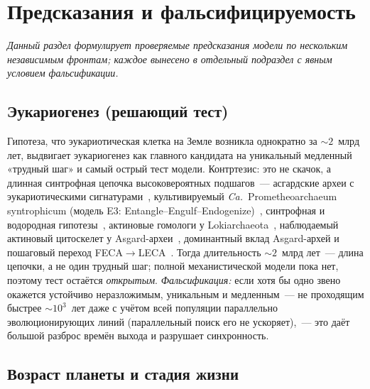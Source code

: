 \documentclass[12pt,a4paper]{article}
\begin{document}
\section{Предсказания и фальсифицируемость}
\label{sec:predictions}

\textit{Данный раздел формулирует проверяемые предсказания модели по нескольким независимым фронтам; каждое вынесено в отдельный подраздел с явным условием фальсификации.}

\subsection{Эукариогенез (решающий тест)}
\label{sec:eukaryo}

Гипотеза, что эукариотическая клетка на Земле возникла однократно за $\sim 2$~млрд лет, выдвигает эукариогенез как главного кандидата на уникальный медленный «трудный шаг» и самый острый тест модели. Контртезис: это не скачок, а длинная синтрофная цепочка высоковероятных подшагов~--- асгардские археи с эукариотическими сигнатурами~\cite{Spang2015,Zaremba2017}, культивируемый \emph{Ca.}~Prometheoarchaeum syntrophicum (модель E3: Entangle--Engulf--Endogenize)~\cite{Imachi2020}, синтрофная и водородная гипотезы~\cite{LopezGarcia2020,Martin1998}, актиновые гомологи у Lokiarchaeota~\cite{Spang2015}, наблюдаемый актиновый цитоскелет у Asgard-археи~\cite{Rodrigues2023}, доминантный вклад Asgard-архей и пошаговый переход FECA$\to$LECA~\cite{Tobiasson2026,Speijer2025,BravoArevalo2025}. Тогда длительность $\sim 2$~млрд лет~--- длина цепочки, а не один трудный шаг; полной механистической модели пока нет, поэтому тест остаётся \emph{открытым}. \emph{Фальсификация:} если хотя бы одно звено окажется устойчиво неразложимым, уникальным и медленным~--- не проходящим быстрее $\sim 10^3$~лет даже с учётом всей популяции параллельно эволюционирующих линий (параллельный поиск его не ускоряет),~--- это даёт большой разброс времён выхода и разрушает синхронность.

\subsection{Возраст планеты и стадия жизни}
\label{sec:pred_planet_age}
\end{document}
